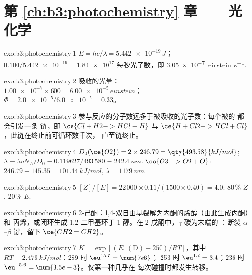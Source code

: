 \section*{第 \ref{ch:b3:photochemistry} 章——光化学}

\begin{solution}{exo:b3:photochemistry:1}
$E = hc/\lambda = \qty{5.442e-19}{J}$；$0.100/\num{5.442e-19} = \num{1.84e17}$ 每秒光子数，即
\qty{3.05e-7}{einstein.s^{-1}}.
\end{solution}

\begin{solution}{exo:b3:photochemistry:2}
吸收的光量：$\num{1.00e-7} \times 600 = \qty{6.00e-5}{einstein}$；$\Phi = \num{2.0e-5}/\num{6.0e-5} = 0.33$。
\end{solution}

\begin{solution}{exo:b3:photochemistry:3}
参与反应的分子数远多于被吸收的光子数：每个被的  都会引发一条
链，即 $\ce{Cl + H2 -> HCl + H}$ 与 $\ce{H + Cl2 -> HCl + Cl}$，此链在终止前可循环数千次，
直至链终止。
\end{solution}

\begin{solution}{exo:b3:photochemistry:4}
$D_0(\ce{O2}) = 2 \times 246.79 = \qty{493.58}{kJ/mol}$; $\lambda = hcN_A/D_0 = 0.119627/493\,580 =
\qty{242.4}{nm}$. $\ce{O3 -> O2 + O}$: $246.79 - 145.35 = \qty{101.44}{kJ/mol}$, $\lambda = \qty{1179}{nm}$.
\end{solution}

\begin{solution}{exo:b3:photochemistry:5}
$[Z]/[E] = 22\,000 \times 0.11/(1500 \times 0.40) = 4.0$: 80\,\% $Z$, 20\,\% $E$.
\end{solution}

\begin{solution}{exo:b3:photochemistry:6}
2-己酮：1,4-双自由基裂解为丙酮的烯醇（由此生成丙酮）和
丙烯，或闭环生成 1,2-二甲基环丁-1-醇。在 2-戊酮中，$\gamma$
碳为末端的 ：断裂 $\alpha$--$\beta$ 键，留下 $\ce{CH2=CH2}$。
\end{solution}

\begin{solution}{exo:b3:photochemistry:7}
$K = \exp[(E_{\mathrm T}(\mathrm D) - 250)/RT]$，其中 $RT = \qty{2.478}{kJ/mol}$：289 时 $\eu^{15.7} = \num{7e6}$；
253 时 $\eu^{1.2} = 3.4$；236 时 $\eu^{-5.6} = \num{3.5e-3}$。仅第一种几乎在
每次碰撞时都发生转移。
\end{solution}

